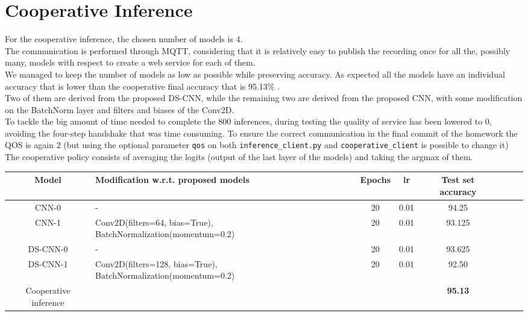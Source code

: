 \documentclass{article}
\begin{document}

\section{Cooperative Inference}
For the cooperative inference, the chosen number of models is 4.\\
The communication is performed through MQTT, considering that it is relatively easy to publish the recording once for all the, possibly many, models with respect to create a web service for each of them.\\
We managed to keep the number of models as low as possible while preserving accuracy.
As expected all the models have an individual accuracy that is lower than the cooperative final accuracy that is 95.13\% .\\
Two of them are derived from the proposed DS-CNN, while the remaining two are derived from the proposed CNN, with some modification on the BatchNorm layer and filters and biases of the Conv2D.\\
To tackle the big amount of time needed to complete the 800 inferences, during testing the quality of service has been lowered to 0,
avoiding the four-step handshake that was time consuming. To ensure the correct communication in the final commit of the homework the
QOS is again 2 (but using the optional parameter \verb#qos# on both \verb#inference_client.py# and \verb#cooperative_client# is possible to change it)\\
The cooperative policy consists of averaging the logits (output of the last layer of the models) and taking the argmax of them.

\vspace{0.2cm}

\begin{center}
\begin{tabular}{ |c|p{6cm}|c|c|c|c|c|c| } 
\hline
\vspace{-0.09cm}

\textbf{Model} &\textbf{Modification w.r.t. proposed models} &\textbf{Epochs}&\textbf{lr} &\textbf{Test set accuracy}\\
\hline
CNN-0&-&20&0.01&94.25\\
CNN-1&Conv2D(filters=64, bias=True), BatchNormalization(momentum=0.2)&20&0.01&93.125\\
DS-CNN-0&-&20&0.01&93.625\\ 
DS-CNN-1&Conv2D(filters=128, bias=True), BatchNormalization(momentum=0.2)&20&0.01&92.50\\
Cooperative inference &&&&\textbf{95.13} \\
\hline

\end{tabular}

\end{center}
\end{document}
